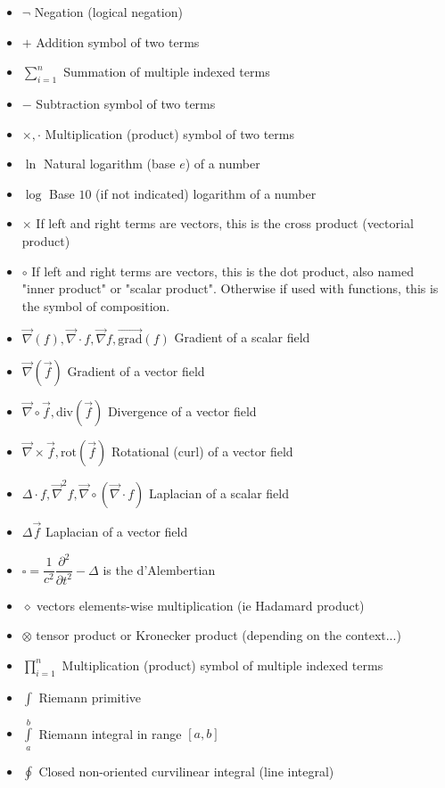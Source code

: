 \documentclass[12pt,a4paper,twoside,openright]{report}
\theoremstyle{definition}
\theoremstyle{itexmp}
\numberwithin{equation}{section}
\begin{document}
\begin{itemize}[label={},leftmargin=0.5cm]
	 	\item $\neg$ Negation (logical negation)
	 	\item $+$ Addition symbol of two terms
	 	\item $\displaystyle \sum_{i=1}^n$ Summation of multiple indexed terms
	 	\item $-$ Subtraction symbol of two terms
	 	\item $\times, \cdot$ Multiplication (product) symbol of two terms
	 	\item $\ln$ Natural logarithm (base $e$) of a number
	 	\item $\log$ Base $10$ (if not indicated) logarithm of a number
	 	\item $\times$ If left and right terms are vectors, this is the cross product (vectorial product)
	 	\item $\circ$ If left and right terms are vectors, this is the dot product, also named "inner product" or "scalar product". Otherwise if used with functions, this is the symbol of composition.
	 	\item $\vec{\nabla}(f),\vec{\nabla}\cdot f,\vec{\nabla}f,\overrightarrow{\text{grad}}(f)$ Gradient of a scalar field
	 	\item $\vec{\nabla}(\vec{f})$ Gradient of a vector field
	 	\item $\vec{\nabla}\circ\vec{f},\text{div}(\vec{f})$ Divergence of a vector field
	 	\item $\vec{\nabla}\times\vec{f},\text{rot}(\vec{f})$ Rotational (curl) of a vector field
	 	\item $\Delta\cdot f,\vec{\nabla}^2 f,\vec{\nabla}\circ(\vec{\nabla}\cdot f)$ Laplacian of a scalar field
	 	\item $\Delta\vec{f}$ Laplacian of a vector field
	 	\item $\square=\dfrac{1}{c^2}\dfrac{\partial^2}{\partial t^2}-\Delta$ is the d'Alembertian
	 	\item $\diamond$ vectors elements-wise multiplication (ie Hadamard product)
	 	\item $\otimes$ tensor product or Kronecker product (depending on the context...) 
	 	\item $\displaystyle \prod_{i=1}^n$ Multiplication (product) symbol of multiple indexed terms
	 	\item $\displaystyle\int$ Riemann primitive
	 	\item $\displaystyle\int\limits_a^b$ Riemann integral in range $[a,b]$
	 	\item $\displaystyle\oint$ Closed non-oriented curvilinear integral (line integral)

\end{itemize}
\end{document}
